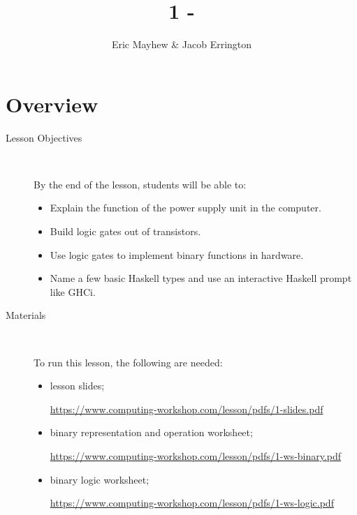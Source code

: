 \documentclass[11pt]{article}
\title{1 - }
\author{Eric Mayhew \& Jacob Errington}
\date{}
\newcommand{\cwurl}{https://www.computing-workshop.com/lesson/pdfs/}
\begin{document}
\maketitle

\section*{Overview}

\begin{description}
  \item[Lesson Objectives] ~

   By the end of the lesson, students will be able to:

  \begin{itemize}
    \item Explain the function of the power supply unit in the computer.


    \item Build logic gates out of transistors.

    \item Use logic gates to implement binary functions in hardware.

    \item Name a few basic Haskell types and use an interactive Haskell prompt
      like GHCi.
  \end{itemize}

  \item [Materials]~

    To run this lesson, the following are needed:

    \begin{itemize}
      \item
        lesson slides;

        \url{\cwurl 1-slides.pdf}

      \item
        binary representation and operation worksheet;

        \url{\cwurl 1-ws-binary.pdf}

      \item
        binary logic worksheet;

        \url{\cwurl 1-ws-logic.pdf}
    \end{itemize}
\end{description}
\end{document}
